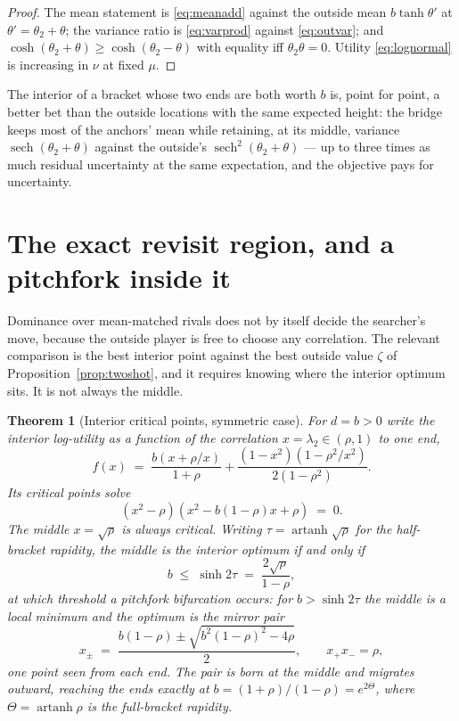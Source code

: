 \documentclass[11pt]{article}
\theoremstyle{itheads}
\newtheorem{theorem}{Theorem}
\newcommand{\sech}{\operatorname{sech}}
\newcommand{\artanh}{\operatorname{artanh}}
\begin{document}
\begin{proof}
The mean statement is \eqref{eq:meanadd} against the outside mean
$b\tanh\theta'$ at $\theta'=\theta_2+\theta$; the variance ratio is
\eqref{eq:varprod} against \eqref{eq:outvar}; and
$\cosh(\theta_2+\theta)\ge\cosh(\theta_2-\theta)$ with equality iff
$\theta_2\theta=0$. Utility \eqref{eq:lognormal} is increasing in $\nu$
at fixed $\mu$.
\end{proof}

The interior of a bracket whose two ends are both worth $b$ is,
point for point, a better bet than the outside locations with the same
expected height: the bridge keeps most of the anchors' mean while
retaining, at its middle, variance
$\sech(\theta_2+\theta)$ against the outside's
$\sech^{2}(\theta_2+\theta)$ --- up to three times as much residual
uncertainty at the same expectation, and the objective pays for
uncertainty.

\section{The exact revisit region, and a pitchfork inside it}

Dominance over mean-matched rivals does not by itself decide the
searcher's move, because the outside player is free to choose any
correlation. The relevant comparison is the best interior point
against the best outside value $\zeta$ of
Proposition~\ref{prop:twoshot}, and it requires knowing where the
interior optimum sits. It is not always the middle.

\begin{theorem}[Interior critical points, symmetric case]\label{thm:pitchfork}
For $d=b>0$ write the interior log-utility as a function of the
correlation $x=\lambda_2\in(\rho,1)$ to one end,
\begin{equation}
f(x) \;=\; \frac{b\left(x+\rho/x\right)}{1+\rho}
+ \frac{\left(1-x^{2}\right)\left(1-\rho^{2}/x^{2}\right)}{2\left(1-\rho^{2}\right)}.
\end{equation}
Its critical points solve
\begin{equation}\label{eq:factor}
\left(x^{2}-\rho\right)\left(x^{2}-b\left(1-\rho\right)x+\rho\right)\;=\;0 .
\end{equation}
The middle $x=\sqrt{\rho}$ is always critical. Writing
$\tau=\artanh\sqrt{\rho}$ for the half-bracket rapidity, the middle
is the interior optimum if and only if
\begin{equation}
b \;\le\; \sinh 2\tau \;=\; \frac{2\sqrt{\rho}}{1-\rho},
\end{equation}
at which threshold a pitchfork bifurcation occurs: for
$b>\sinh 2\tau$ the middle is a local minimum and the optimum is the
mirror pair
\begin{equation}\label{eq:offmid}
x_{\pm} \;=\; \frac{b\left(1-\rho\right)
\pm\sqrt{b^{2}\left(1-\rho\right)^{2}-4\rho}}{2},
\qquad x_{+}x_{-}=\rho,
\end{equation}
one point seen from each end. The pair is born at the middle and
migrates outward, reaching the ends exactly at
$b=\left(1+\rho\right)/\left(1-\rho\right)=e^{2\Theta}$, where
$\Theta=\artanh\rho$ is the full-bracket rapidity.
\end{theorem}
\end{document}

